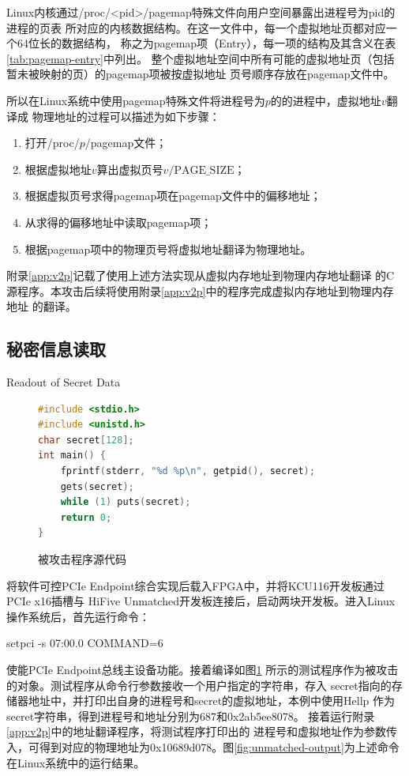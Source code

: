 Linux内核通过/proc/<pid>/pagemap特殊文件向用户空间暴露出进程号为pid的进程的页表
所对应的内核数据结构。在这一文件中，每一个虚拟地址页都对应一个64位长的数据结构，
称之为pagemap项（Entry），每一项的结构及其含义在表\ref{tab:pagemap-entry}中列出。
整个虚拟地址空间中所有可能的虚拟地址页（包括暂未被映射的页）的pagemap项被按虚拟地址
页号顺序存放在pagemap文件中。\cite{pagemap}

所以在Linux系统中使用pagemap特殊文件将进程号为$p$的的进程中，虚拟地址$v$翻译成
物理地址的过程可以描述为如下步骤：
\begin{enumerate}
	\item 打开/proc/$p$/pagemap文件；
	\item 根据虚拟地址$v$算出虚拟页号$v / \text{PAGE\_SIZE}$；
	\item 根据虚拟页号求得pagemap项在pagemap文件中的偏移地址；
	\item 从求得的偏移地址中读取pagemap项；
	\item 根据pagemap项中的物理页号将虚拟地址翻译为物理地址。
\end{enumerate}

附录\ref{app:v2p}记载了使用上述方法实现从虚拟内存地址到物理内存地址翻译
的C源程序。本攻击后续将使用附录\ref{app:v2p}中的程序完成虚拟内存地址到物理内存地址
的翻译。

\subsection{秘密信息读取}{Readout of Secret Data}

\begin{figure}[ht]
	\centering
	\begin{lstlisting}[language=c, escapechar=|]
#include <stdio.h>
#include <unistd.h>
char secret[128];
int main() {
	fprintf(stderr, "%d %p\n", getpid(), secret);
	gets(secret);
	while (1) puts(secret);
	return 0;
}
	\end{lstlisting}
	\caption{被攻击程序源代码}
	\label{fig:target-src}
\end{figure}

将软件可控PCIe Endpoint综合实现后载入FPGA中，并将KCU116开发板通过PCIe x16插槽与
HiFive Unmatched开发板连接后，启动两块开发板。进入Linux操作系统后，首先运行命令：

setpci -s 07:00.0 COMMAND=6

\noindent 使能PCIe Endpoint总线主设备功能。接着编译如图\ref{fig:target-src}
所示的测试程序作为被攻击的对象。测试程序从命令行参数接收一个用户指定的字符串，存入
secret指向的存储器地址中，并打印出自身的进程号和secret的虚拟地址，本例中使用Hellp
作为secret字符串，得到进程号和地址分别为687和0x2ab5ee8078。
接着运行附录\ref{app:v2p}中的地址翻译程序，将测试程序打印出的
进程号和虚拟地址作为参数传入，可得到对应的物理地址为0x10689d078。图\ref{fig:unmatched-output}为上述命令
在Linux系统中的运行结果。

